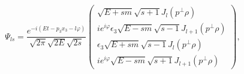 \begin{equation}
\Psi _{ls}=\frac{e^{-i(Et-p_{3}x_{3}-l\varphi )}}{\sqrt{2\pi} \sqrt{2E}\sqrt{2s}}%
\left(
\begin{array}{c}
\sqrt{E+sm}\sqrt{s+1}J_{l}\left( p^{\bot }\rho \right) \\
ie^{i\varphi }\epsilon _{3}\sqrt{E-sm}\sqrt{s-1}J_{l+1}\left( p^{\bot }\rho
\right) \\
\epsilon _{3}\sqrt{E+sm}\sqrt{s-1}J_{l}\left( p^{\bot }\rho \right) \\
ie^{i\varphi }\sqrt{E-sm}\sqrt{s+1}J_{l+1}\left( p^{\bot }\rho \right)
\end{array}
\right) ,
\end{equation}

